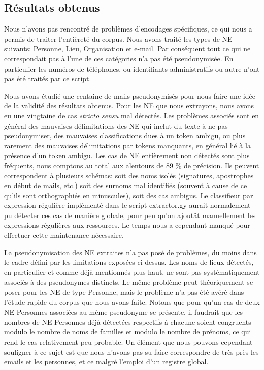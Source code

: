 \documentclass{article}
\begin{document}
\subsection{Résultats obtenus}
\par
Nous n'avons pas rencontré de problèmes d'encodages spécifiques, ce qui nous a permis de traiter l'entièreté du corpus.
Nous avons traité les types de NE suivants: Personne, Lieu, Organisation et e-mail.
Par conséquent tout ce qui ne correspondait pas à l'une de ces catégories n'a pas été pseudonymisée.
En particulier les numéros de téléphones, ou identifiants administratifs ou autre n'ont pas été traités par ce script.
\par
Nous avons étudié une centaine de mails pseudonymisés pour nous faire une idée de la validité des résultats obtenus.
Pour les NE que nous extrayons, nous avons eu une vingtaine de cas \textit{stricto sensu} mal détectés.
Les problèmes associés sont en général des mauvaises délimitations des NE qui inclut du texte à ne pas pseudonymiser, des mauvaises classifications dues à un token ambigu, ou plus rarement des mauvaises délimitations par tokens manquants, en général lié à la présence d'un token ambigu. 
Les cas de NE entièrement non détectés sont plus fréquents, nous comptons au total aux alentours de 89 \% de précision.
Ils peuvent correspondent à plusieurs schémas: soit des noms isolés (signatures, apostrophes en début de mails, etc.) soit des surnoms mal identifiés (souvent à cause de ce qu'ils sont orthographiés en minuscules), soit des cas ambigus.
Le classifieur par expression régulière implémenté dans le script extractor.gy aurait normalement pu détecter ces cas de manière globale, pour peu qu'on ajoutât manuellement les expressions régulières aux ressources.
Le temps nous a cependant manqué pour effectuer cette maintenance nécessaire.
\par
La pseudonymisation des NE extraites n'a pas posé de problèmes, du moins dans le cadre défini par les limitations exposées ci-dessus.
Les noms de lieux détectés, en particulier et comme déjà mentionnés plus haut, ne sont pas systématiquement associés à des pseudonymes distincts.
Le même problème peut théoriquement se poser pour les NE de type Personne, mais le problème n'a pas été avéré dans l'étude rapide du corpus que nous avons faite.
Notons que pour qu'un cas de deux NE Personnes associées au même pseudonyme se présente, il faudrait que les nombres de NE Personnes déjà détectées respectifs à chacune soient congruents modulo le nombre de noms de familles et modulo le nombre de prénoms, ce qui rend le cas relativement peu probable.
Un élément que nous pouvons cependant souligner à ce sujet est que nous n'avons pas su faire correspondre de très près les emails et les personnes, et ce malgré l'emploi d'un registre global. 
\end{document}
